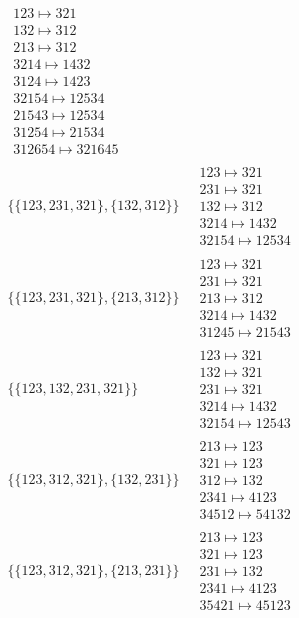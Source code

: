 \begin{scriptsize}
\begin{align}
\begin{matrix}
123 \mapsto 321\\132 \mapsto 312\\213 \mapsto 312\\3214 \mapsto 1432\\3124 \mapsto 1423\\32154 \mapsto 12534\\21543 \mapsto 12534\\31254 \mapsto 21534\\312654 \mapsto 321645
\end{matrix}
\\
\{\{123, 231, 321\}, \{132, 312\}\}
\ 
&
\begin{matrix}
123 \mapsto 321\\231 \mapsto 321\\132 \mapsto 312\\3214 \mapsto 1432\\32154 \mapsto 12534
\end{matrix}
\\
\{\{123, 231, 321\}, \{213, 312\}\}
\ 
&
\begin{matrix}
123 \mapsto 321\\231 \mapsto 321\\213 \mapsto 312\\3214 \mapsto 1432\\31245 \mapsto 21543
\end{matrix}
\\
\{\{123, 132, 231, 321\}\}
\ 
&
\begin{matrix}
123 \mapsto 321\\132 \mapsto 321\\231 \mapsto 321\\3214 \mapsto 1432\\32154 \mapsto 12543
\end{matrix}
\\
\{\{123, 312, 321\}, \{132, 231\}\}
\ 
&
\begin{matrix}
213 \mapsto 123\\321 \mapsto 123\\312 \mapsto 132\\2341 \mapsto 4123\\34512 \mapsto 54132
\end{matrix}
\\
\{\{123, 312, 321\}, \{213, 231\}\}
\ 
&
\begin{matrix}
213 \mapsto 123\\321 \mapsto 123\\231 \mapsto 132\\2341 \mapsto 4123\\35421 \mapsto 45123

\end{matrix}
\end{align}
\end{scriptsize}
